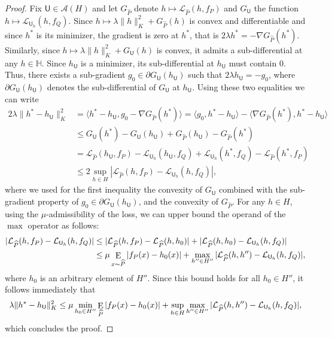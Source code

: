 \documentclass[twoside,11pt]{article}
\def\Hset{\mathbb{H}}
\DeclareMathOperator*{\E}{\rm E}
\providecommand{\norm}[2]{\lVert#1\rVert_{#2}}
\newcommand{\h}{\widehat}
\newcommand{\cA}{{\mathcal A}}
\newcommand{\cL}{{\mathcal L}}
\newcommand{\1}{\mat{1}}
\newcommand{\UU}{{\mathsf U}}
\begin{document}
\begin{proof}
  Fix $\UU \in \cA(H)$ and let $G_{\h P}$ denote
$h \mapsto \cL_{\h P}(h, f_P)$ and $G_\UU$ the function
$h \mapsto \cL_{\UU_h}(h, f_Q)$. Since
$h \mapsto \lambda \norm{h}{K}^2 + G_{\h P}(h)$ is convex and
differentiable and since $h^*$ is its minimizer, the gradient is zero
at $h^*$, that is $2 \lambda h^* = -\nabla G_{\h P}(h^*)$. Similarly,
since $h \mapsto \lambda \norm{h}{K}^2 + G_\UU(h)$ is convex, it
admits a sub-differential at any $h \in \Hset$. Since $h_\UU$ is a
minimizer, its sub-differential at $h_\UU$ must contain $0$. Thus,
there exists a sub-gradient $g_0 \in \partial G_\UU(h_\UU)$ such that
$2 \lambda h_\UU = -g_0$, where $\partial G_\UU(h_\UU)$ denotes the
sub-differential of $G_\UU$ at $h_\UU$. Using these two equalities we
can write
\begin{align*}
  2 \lambda \norm{h^* - h_\UU}{K}^2
& = \langle h^* - h_\UU, g_0 - \nabla G_{\h P}(h^*) \rangle
= \langle g_0, h^* - h_\UU \rangle -
  \langle \nabla G_{\h P}(h^*), h^* - h_\UU \rangle \\
& \leq G_\UU(h^*) - G_\UU(h_\UU) + G_{\h P}(h_\UU) - G_{\h P}(h^*) \\
& =  \cL_{\h P}(h_\UU, f_P) -\cL_{\UU_h}(h_\UU, f_Q)
+ \cL_{\UU_h}(h^*, f_Q) -\cL_{\h P}(h^*, f_P) \\
& \leq 2 \sup_{h \in H} |\cL_{\h P}(h, f_P) -\cL_{\UU_h}(h, f_Q)|,
\end{align*}
where we used for the first inequality the convexity of $G_\UU$
combined with the sub-gradient property of
$g_0 \in \partial G_\UU(h_\UU)$, and the convexity of $G_{\h P}$.
For any $h \in H$, using the $\mu$-admissibility of the loss,
we can upper bound the operand of the $\max$ operator as follows:
\begin{align*}
|\cL_{\h P}(h, f_P) - \cL_{\UU_h}(h, f_Q)|
&  \leq |\cL_{\h P}(h, f_P) - \cL_{\h P}(h, h_0)|  + |\cL_{\h P}(h, h_0) -
   \cL_{\UU_h}(h, f_Q)| \\
& \leq \mu \E_{x \sim \h P}|f_P(x) - h_0(x)|  +
   \max_{h'' \in H''} |\cL_{\h P}(h, h'') - \cL_{\UU_h}(h, f_Q)|,
\end{align*}
where $h_0$ is an arbitrary element of $H''$. Since this bound holds
for all $h_0 \in H''$, it follows immediately that
\begin{equation*}
\lambda \norm{h^* - h_\UU}{K}^2
\leq \mu \min_{h_0 \in H''} \E_{\h P} | f_P(x) -  h_0(x) |
+ \sup_{h \in H} \max_{h'' \in H''} |\cL_{\h P}(h, h'') -\cL_{\UU_h}(h, f_Q) |,
\end{equation*}
which concludes the proof.
\end{proof}
\end{document}
